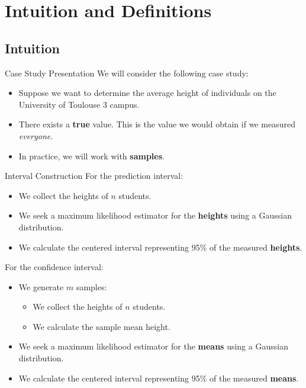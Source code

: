 \section[Intuition and Definitions]{Intuition and Definitions}

\subsection[Intuition]{Intuition}

\begin{frame}{Case Study Presentation}
	We will consider the following case study:
	\begin{itemize}
		\item Suppose we want to determine the average height of individuals on the University of Toulouse 3 campus.
		\pause
		\item There exists a \textbf{true} value. This is the value we would obtain if we measured \textit{everyone}.
		\pause
		\item In practice, we will work with \textbf{samples}.
	\end{itemize}
\end{frame}

\begin{frame}{Interval Construction}
	For the prediction interval:
	\begin{itemize}
		\item We collect the heights of $n$ students.
		\item We seek a maximum likelihood estimator for the \textbf{heights} using a Gaussian distribution.
		\item We calculate the centered interval representing 95\% of the measured \textbf{heights}.
	\end{itemize}
	\pause
	For the confidence interval:
	\begin{itemize}
		\item We generate $m$ samples:
		\begin{itemize}
			\item We collect the heights of $n$ students.
			\item We calculate the sample mean height.
		\end{itemize}		
		\item We seek a maximum likelihood estimator for the \textbf{means} using a Gaussian distribution.
		\item We calculate the centered interval representing 95\% of the measured \textbf{means}.
	\end{itemize}
\end{frame}

